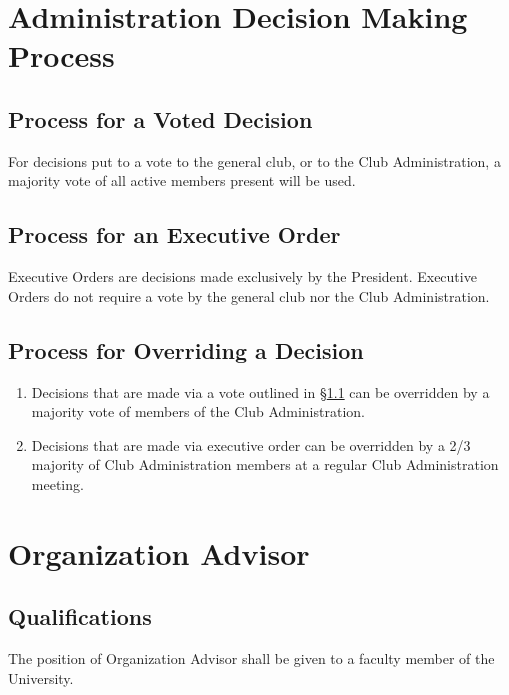 \documentclass[english,11pt]{article}
\begin{document}
\section{Administration Decision Making Process} \label{art:decision-making}

\subsection{Process for a Voted Decision} \label{sect:decision-making:voted}
For decisions put to a vote to the general club, or to the Club Administration, a majority vote of all active members present will be used.

\subsection{Process for an Executive Order} \label{sect:decision-making:executive-order}
Executive Orders are decisions made exclusively by the President.
Executive Orders do not require a vote by the general club nor the Club Administration.

\subsection{Process for Overriding a Decision} \label{sect:decision-making:override}
\begin{enumerate}[label=\Alph*.]
    \item Decisions that are made via a vote outlined in §\ref{sect:decision-making:voted} can be overridden by a majority vote of members of the Club Administration.
    \item Decisions that are made via executive order can be overridden by a 2/3 majority of Club Administration members at a regular Club Administration meeting.
\end{enumerate}

\section{Organization Advisor} \label{art:advisor}

\subsection{Qualifications} \label{sect:advisor:qualifications}
The position of Organization Advisor shall be given to a faculty member of the University.
\end{document}
